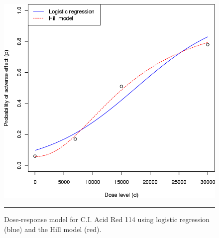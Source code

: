 \begin{figure}[!t]
\centering
  \includegraphics[width=0.5\linewidth]{Images/testA9.png}
  \caption[\small Dose-response model for C.I. Acid Red 114 using the Hill model]{\small Dose-response model for C.I. Acid Red 114 using logistic regression (blue) and the Hill model (red).}
  \label{fig:testA9}\hrule
\end{figure}



